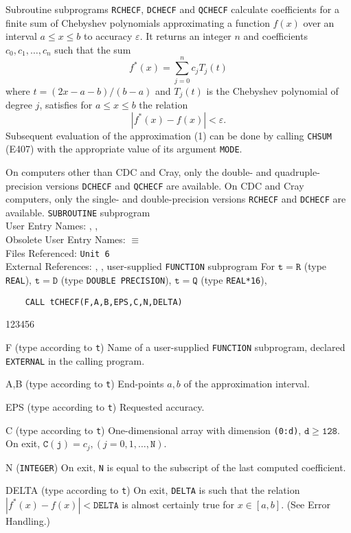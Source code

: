                           
                           
                    
                    
Subroutine subprograms {\tt RCHECF}, {\tt DCHECF} and {\tt QCHECF}
calculate coefficients for a finite sum of Chebyshev polynomials
approximating a function $f(x)$ over an interval $a\le x\le b$ to
accuracy $\varepsilon$. It returns an integer $n$ and coefficients
$c_0,c_1,\ldots,c_n$ such that the sum
\begin{equation}
f^*(x) = \sum^n_{j=0} c_j T_j(t)
\end{equation}
where $t = (2x - a - b)/(b - a)$ and $T_j(t)$ is the Chebyshev
polynomial of degree $j$, satisfies for $a\le x\le b$ the relation
\begin{equation}
|f^*(x) - f(x)| < \varepsilon.
\end{equation}
Subsequent evaluation of the approximation (1) can be done
by calling  {\tt CHSUM} (E407) with
the appropriate value of its argument {\tt MODE}.
\par
On computers other than CDC and Cray, only the double- and
quadruple-precision versions {\tt DCHECF} and {\tt QCHECF} are
available. On CDC and Cray computers, only the single- and
double-precision versions {\tt RCHECF} and {\tt DCHECF} are available.
\Structure
{\tt SUBROUTINE} subprogram \\
User Entry Names: , ,  \\
Obsolete User Entry Names:  $\equiv$  \\
Files Referenced: {\tt Unit 6} \\
External References: , ,
user-supplied {\tt FUNCTION} subprogram
\Usage
For $\mathtt{t=R}$ (type {\tt REAL}), $\mathtt{t=D}$ (type
{\tt DOUBLE PRECISION}), $\mathtt{t=Q}$ (type {\tt REAL*16}),
\begin{verbatim}
    CALL tCHECF(F,A,B,EPS,C,N,DELTA)
\end{verbatim}
\begin{DLtt}{123456}
\item[F] (type according to {\tt t}) Name of a user-supplied
{\tt FUNCTION} subprogram, declared {\tt EXTERNAL} in the calling
program.
\item[A,B] (type according to {\tt t})
End-points $a,b$ of the approximation interval.
\item[EPS] (type according to {\tt t}) Requested accuracy.
\item[C] (type according to {\tt t}) One-dimensional array
with dimension {\tt (0:d)}, $\mathtt{d \ge 128}$. On exit,
$\mathtt{C(j)} = c_j,(j = 0,1,\ldots,\mathtt{N})$.
\item[N] ({\tt INTEGER}) On exit, {\tt N} is equal to the subscript
of the last computed coefficient.
\item[DELTA] (type according to {\tt t}) On exit, {\tt DELTA} is such
that the relation $|f^*(x) - f(x)| < \mathtt{DELTA}$
is almost certainly true for $x \in [a,b]$. (See Error Handling.)
\end{DLtt}
